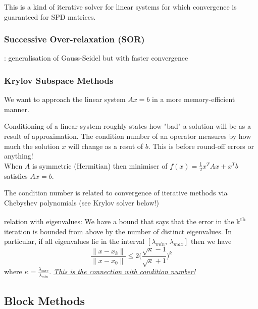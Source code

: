 This is a kind of iterative solver for linear systems for which convergence is guaranteed for SPD matrices.

\subsubsection{Successive Over-relaxation (SOR)}: generalisation of Gauss-Seidel but with faster convergence

\subsubsection{Krylov Subspace Methods}

We want to approach the linear system $Ax=b$ in a more memory-efficient manner.

Conditioning of a linear system roughly states how "bad" a solution will be as a result of approximation.
The condition number of an operator measures by how much the solution $x$ will change as a resut of $b$.
This is before round-off errors or anything!\\

When $A$ is symmetric (Hermitian) then minimiser of $f(x) = \frac12 x^T Ax + x^T b$ satisfies
$Ax=b$.
 
The condition number is related to convergence of iterative methods via Chebyshev polynomials (see Krylov solver below!)

relation with eigenvalues: We have a bound that says that the error in the k\textsuperscript{th} iteration is bounded from above
by the number of distinct eigenvalues. In particular, if all eigenvalues lie in the interval $[\lambda_{min},\,\lambda_{max}]$ then we
have 
\[
\frac{\|x-x_k\|}{\|x-x_0\|} \leq 2 \Big(\frac{\sqrt{\kappa}-1}{\sqrt{\kappa}+1}\Big)^k
\]
where $\kappa = \frac{\lambda_{max}}{\lambda_{min}}$.
\underline{\emph{This is the connection with condition number!}}

\subsection{Block Methods}

